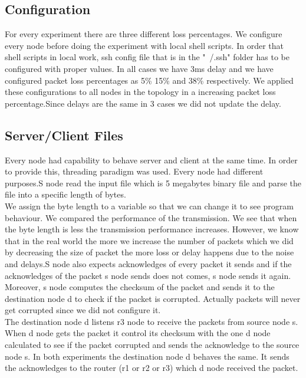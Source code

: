 \documentclass[conference]{IEEEtran}
\begin{document}
\subsection{Configuration}

For every experiment there are three different loss percentages. We configure every node before doing the experiment with local shell scripts. In order that shell scripts in local work, ssh config file that is in the "~/.ssh" folder has to be configured with proper values. In all cases we have 3ms delay and we have configured packet loss percentages as 5\% 15\% and 38\% respectively. We applied these configurations to all nodes in the topology in a increasing packet loss percentage.Since delays are the same in 3 cases we did not update the delay.\\


\subsection{Server/Client Files}

Every node had capability to behave server and client at the same time. In order to provide this, threading paradigm was used. Every node had different purposes.S node read the input file which is 5 megabytes binary file and parse the file into a specific length of bytes.\\

We assign the byte length to a variable so that we can change it to see program behaviour. We compared the performance of the transmission. We see that when the byte length is less the transmission performance increases. However, we know that in the real world the more we increase the number of packets which we did by decreasing the size of packet the more loss or delay happens due to the noise and delays.S node also expects acknowledges of every packet it sends and if the acknowledges of the packet s node sends does not comes, s node sends it again. Moreover, s node computes the checksum of the packet and sends it to the destination node d to check if the packet is corrupted. Actually packets will never get corrupted since we did not configure it.\\

The destination node d listens r3 node to receive the packets from source node s. When d node gets the packet it control its checksum with the one d node calculated to see if the packet corrupted and sends the acknowledge to the source node s. In both experiments the destination node d behaves the same. It sends the acknowledges to the router (r1 or r2 or r3) which d node received the packet. \\
\end{document}
